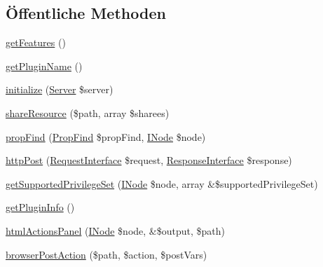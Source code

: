 \subsection*{Öffentliche Methoden}
\begin{DoxyCompactItemize}
\item 
\mbox{\hyperlink{class_sabre_1_1_d_a_v_1_1_sharing_1_1_plugin_a7fb4803c12a90954df26c4b36b908f67}{get\+Features}} ()
\item 
\mbox{\hyperlink{class_sabre_1_1_d_a_v_1_1_sharing_1_1_plugin_a32d38f7f07a6ea3eaa3c6b0d791c57bd}{get\+Plugin\+Name}} ()
\item 
\mbox{\hyperlink{class_sabre_1_1_d_a_v_1_1_sharing_1_1_plugin_af86d8277d71915a4347e7075871f2012}{initialize}} (\mbox{\hyperlink{class_sabre_1_1_d_a_v_1_1_server}{Server}} \$server)
\item 
\mbox{\hyperlink{class_sabre_1_1_d_a_v_1_1_sharing_1_1_plugin_afa888107e0d3990f50fb825d6fcdac8c}{share\+Resource}} (\$path, array \$sharees)
\item 
\mbox{\hyperlink{class_sabre_1_1_d_a_v_1_1_sharing_1_1_plugin_a526e2012f4bc4eaf7e667341026c4a15}{prop\+Find}} (\mbox{\hyperlink{class_sabre_1_1_d_a_v_1_1_prop_find}{Prop\+Find}} \$prop\+Find, \mbox{\hyperlink{interface_sabre_1_1_d_a_v_1_1_i_node}{I\+Node}} \$node)
\item 
\mbox{\hyperlink{class_sabre_1_1_d_a_v_1_1_sharing_1_1_plugin_a4d81214d6f9aeadb7b2f161406f47eaa}{http\+Post}} (\mbox{\hyperlink{interface_sabre_1_1_h_t_t_p_1_1_request_interface}{Request\+Interface}} \$request, \mbox{\hyperlink{interface_sabre_1_1_h_t_t_p_1_1_response_interface}{Response\+Interface}} \$response)
\item 
\mbox{\hyperlink{class_sabre_1_1_d_a_v_1_1_sharing_1_1_plugin_a6816434e0bb16720f32d12ea962aaa4b}{get\+Supported\+Privilege\+Set}} (\mbox{\hyperlink{interface_sabre_1_1_d_a_v_1_1_i_node}{I\+Node}} \$node, array \&\$supported\+Privilege\+Set)
\item 
\mbox{\hyperlink{class_sabre_1_1_d_a_v_1_1_sharing_1_1_plugin_a20f09429aa1c069e03f2d15c6b6a35c8}{get\+Plugin\+Info}} ()
\item 
\mbox{\hyperlink{class_sabre_1_1_d_a_v_1_1_sharing_1_1_plugin_a422ac3a39fb902860cada87ab98abe88}{html\+Actions\+Panel}} (\mbox{\hyperlink{interface_sabre_1_1_d_a_v_1_1_i_node}{I\+Node}} \$node, \&\$output, \$path)
\item 
\mbox{\hyperlink{class_sabre_1_1_d_a_v_1_1_sharing_1_1_plugin_a1c92393af768740f55f79659d935c27f}{browser\+Post\+Action}} (\$path, \$action, \$post\+Vars)
\end{DoxyCompactItemize}
